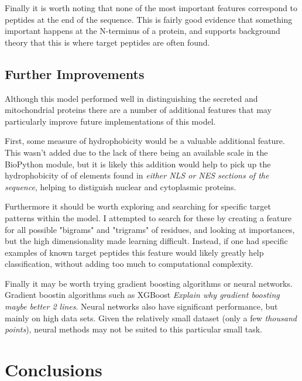 \documentclass{bioinfo}
\begin{document}
Finally it is worth noting that none of the most important features correspond to peptides at the end of the sequence.  This is fairly good evidence that something important happens at the N-terminus of a protein, and  supports background theory that this is where target peptides are often found.


\subsection{Further Improvements}

Although this model performed well in distinguishing the secreted and mitochondrial proteins there are a number of additional features that may particularly improve future implementations of this model. 

First, some measure of hydrophobicity would be a valuable additional feature. This wasn't added due to the lack of there being an available scale in the BioPython module, but it is likely this addition would help to pick up the hydrophobicity of of elements found in \textit{either NLS or NES sections of the sequence}, helping to distiguish nuclear and cytoplasmic proteins.

Furthermore it should be worth exploring and searching for specific target patterns within the model. I attempted to search for these by creating a feature for all possible "bigrams" and "trigrams" of residues, and looking at importances, but the high dimensionality made learning difficult. Instead, if one had specific examples of known target peptides this feature would likely greatly help classification, without adding too much to computational complexity.

Finally it may be worth trying gradient boosting algorithms or neural networks. Gradient boostin algorithms such as XGBoost \textit{Explain why gradient boosting maybe better 2 lines}. Neural networks also have significant performance, but mainly on high data sets. Given the relatively small dataset (only a few \textit{thousand points}), neural methods may not be suited to this particular small task.

\section{Conclusions}



\end{document}
